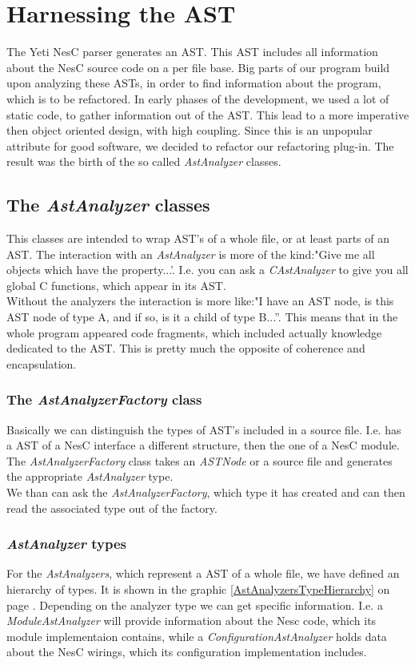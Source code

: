 \documentclass[a4paper,10pt]{report}
\begin{document}
\chapter{Harnessing the AST}
\label{harnessingTheAST}
The Yeti NesC parser generates an AST. This AST includes all information about the NesC source code on a per file base.
Big parts of our program build upon analyzing these ASTs, in order to find information about the program, which is to be refactored.
In early phases of the development, we used a lot of static code, to gather information out of the AST.
This lead to a more imperative then object oriented design, with high coupling.
Since this is an unpopular attribute for good software, we decided to refactor our refactoring plug-in. 
The result was the birth of the so called {\it AstAnalyzer} classes.

\section{The {\it AstAnalyzer} classes}
\label{AstAnalyzerClasses}
This classes are intended to wrap AST's of a whole file, or at least parts of an AST.
The interaction with an {\it AstAnalyzer} is more of the kind:"Give me all objects which have the property...'.
I.e. you can ask a {\it CAstAnalyzer} to give you all global C functions, which appear in its AST.\\
Without the analyzers the interaction is more like:"I have an AST node, is this AST node of type A, and if so, is it a child of type B...''.
This means that in the whole program appeared code fragments, which included actually knowledge dedicated to the AST.
This is pretty much the opposite of coherence and encapsulation.

\subsection{The {\it AstAnalyzerFactory} class}
Basically we can distinguish the types of AST's included in a source file. I.e. has a AST of a NesC interface a different structure, then the one of a NesC module.
The {\it AstAnalyzerFactory} class takes an {\it ASTNode} or a source file and generates the appropriate {\it AstAnalyzer} type.\\
We than can ask the {\it AstAnalyzerFactory}, which type it has created and can then read the associated type out of the factory.

\subsection{{\it AstAnalyzer} types}
For the {\it AstAnalyzers}, which represent a AST of a whole file, we have defined an hierarchy of types.
It is shown in the graphic \ref{AstAnalyzersTypeHierarchy} on page \pageref{AstAnalyzersTypeHierarchy}.
Depending on the analyzer type we can get specific information. 
I.e. a {\it ModuleAstAnalyzer} will provide information about the Nesc code, which its module implementaion contains,
while a {\it ConfigurationAstAnalyzer} holds data about the NesC wirings, which its configuration implementation includes.
\end{document}
